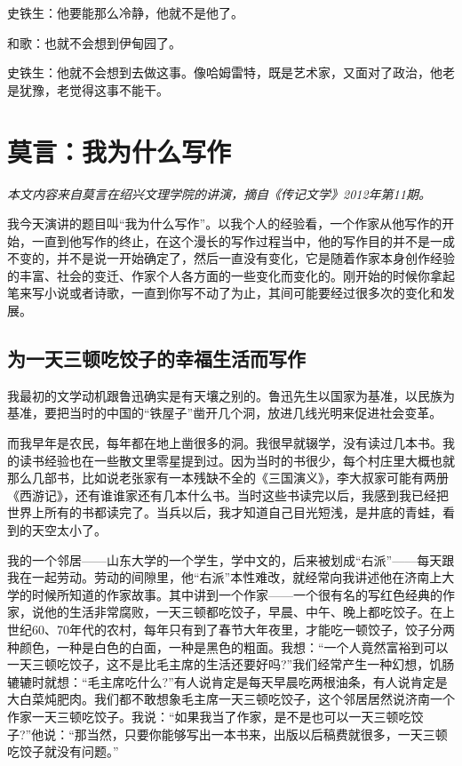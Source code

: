 \documentclass[12pt,a5paper]{ctexbook}
\begin{document}
史铁生：他要能那么冷静，他就不是他了。

和歌：也就不会想到伊甸园了。

史铁生：他就不会想到去做这事。像哈姆雷特，既是艺术家，又面对了政治，他老是犹豫，老觉得这事不能干。

\newpage

\section{莫言：我为什么写作}
\emph{本文内容来自莫言在绍兴文理学院的讲演，摘自《传记文学》2012年第11期。}
\vspace{2em}

我今天演讲的题目叫“我为什么写作”。以我个人的经验看，一个作家从他写作的开始，一直到他写作的终止，在这个漫长的写作过程当中，他的写作目的并不是一成不变的，并不是说一开始确定了，然后一直没有变化，它是随着作家本身创作经验的丰富、社会的变迁、作家个人各方面的一些变化而变化的。刚开始的时候你拿起笔来写小说或者诗歌，一直到你写不动了为止，其间可能要经过很多次的变化和发展。

\subsection{为一天三顿吃饺子的幸福生活而写作}

我最初的文学动机跟鲁迅确实是有天壤之别的。鲁迅先生以国家为基准，以民族为基准，要把当时的中国的“铁屋子”凿开几个洞，放进几线光明来促进社会变革。

而我早年是农民，每年都在地上凿很多的洞。我很早就辍学，没有读过几本书。我的读书经验也在一些散文里零星提到过。因为当时的书很少，每个村庄里大概也就那么几部书，比如说老张家有一本残缺不全的《三国演义》，李大叔家可能有两册《西游记》，还有谁谁家还有几本什么书。当时这些书读完以后，我感到我已经把世界上所有的书都读完了。当兵以后，我才知道自己目光短浅，是井底的青蛙，看到的天空太小了。

我的一个邻居——山东大学的一个学生，学中文的，后来被划成“右派”——每天跟我在一起劳动。劳动的间隙里，他“右派”本性难改，就经常向我讲述他在济南上大学的时候所知道的作家故事。其中讲到一个作家——一个很有名的写红色经典的作家，说他的生活非常腐败，一天三顿都吃饺子，早晨、中午、晚上都吃饺子。在上世纪60、70年代的农村，每年只有到了春节大年夜里，才能吃一顿饺子，饺子分两种颜色，一种是白色的白面，一种是黑色的粗面。我想：“一个人竟然富裕到可以一天三顿吃饺子，这不是比毛主席的生活还要好吗?”我们经常产生一种幻想，饥肠辘辘时就想：“毛主席吃什么?”有人说肯定是每天早晨吃两根油条，有人说肯定是大白菜炖肥肉。我们都不敢想象毛主席一天三顿吃饺子，这个邻居居然说济南一个作家一天三顿吃饺子。我说：“如果我当了作家，是不是也可以一天三顿吃饺子?”他说：“那当然，只要你能够写出一本书来，出版以后稿费就很多，一天三顿吃饺子就没有问题。”
\end{document}
